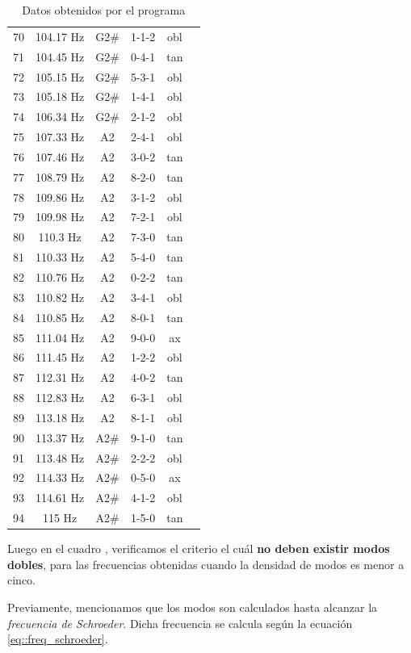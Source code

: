 \begin{table}[H]
\begin{tabular}{|c|c|c|c|c|c|}
70&104.17 Hz&G2\#&1-1-2&obl\\
71&104.45 Hz&G2\#&0-4-1&tan\\
72&105.15 Hz&G2\#&5-3-1&obl\\
73&105.18 Hz&G2\#&1-4-1&obl\\
74&106.34 Hz&G2\#&2-1-2&obl\\
75&107.33 Hz&A2&2-4-1&obl\\
76&107.46 Hz&A2&3-0-2&tan\\
77&108.79 Hz&A2&8-2-0&tan\\
78&109.86 Hz&A2&3-1-2&obl\\
79&109.98 Hz&A2&7-2-1&obl\\
80&110.3 Hz&A2&7-3-0&tan\\
81&110.33 Hz&A2&5-4-0&tan\\
82&110.76 Hz&A2&0-2-2&tan\\
83&110.82 Hz&A2&3-4-1&obl\\
84&110.85 Hz&A2&8-0-1&tan\\
85&111.04 Hz&A2&9-0-0&ax\\
86&111.45 Hz&A2&1-2-2&obl\\
87&112.31 Hz&A2&4-0-2&tan\\
88&112.83 Hz&A2&6-3-1&obl\\
89&113.18 Hz&A2&8-1-1&obl\\
90&113.37 Hz&A2\#&9-1-0&tan\\
91&113.48 Hz&A2\#&2-2-2&obl\\
92&114.33 Hz&A2\#&0-5-0&ax\\
93&114.61 Hz&A2\#&4-1-2&obl\\
94&115 Hz&A2\#&1-5-0&tan\\
\hline
    \end{tabular}
    \caption{Datos obtenidos por el programa}
    \label{tab:datos_obtenidos_programa}
\end{table}


\newpage

\par Luego en el cuadro , verificamos el criterio el cuál \textbf{no deben existir modos dobles}, para las frecuencias obtenidas cuando la densidad de modos es menor a cinco.\\


\par Previamente, mencionamos que los modos son calculados hasta alcanzar la \textit{frecuencia de Schroeder}. Dicha frecuencia se calcula según la ecuación \eqref{eq::freq_schroeder}.

